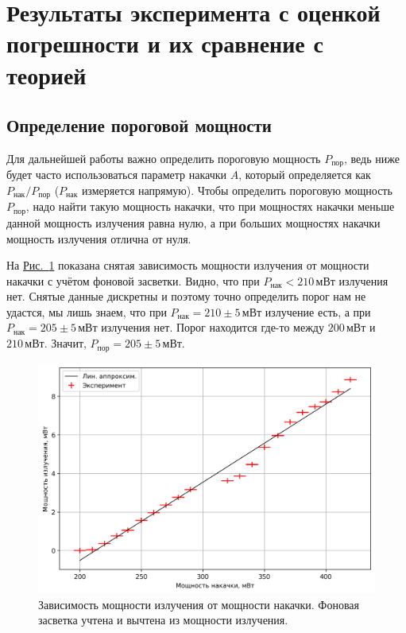 \documentclass[12pt]{article}
\newcommand*{\figref}[2][]{\hyperref[#2]{Рис.~\ref*{#2}#1}}
\begin{document}
	\section{Результаты эксперимента с оценкой погрешности и их сравнение с теорией}

	\subsection{Определение пороговой мощности}

	Для дальнейшей работы важно определить пороговую мощность $P_\text{пор}$, ведь ниже будет часто использоваться параметр накачки $A$, который определяется как $P_\text{нак} / P_\text{пор}$ ($P_\text{нак}$ измеряется напрямую). Чтобы определить пороговую мощность $P_\text{пор}$, надо найти такую мощность накачки, что при мощностях накачки меньше данной мощность излучения равна нулю, а при больших мощностях накачки мощность излучения отлична от нуля.

	На \figref{fig:p_iz_vs_p_nak} показана снятая зависимость мощности излучения от мощности накачки с учётом фоновой засветки. Видно, что при $P_\text{нак}<210\,\text{мВт}$ излучения нет. Снятые данные дискретны и поэтому точно определить порог нам не удастся, мы лишь знаем, что при $P_\text{нак}=210\pm5\,\text{мВт}$ излучение есть, а при $P_\text{нак}=205\pm5\,\text{мВт}$ излучения нет. Порог находится где-то между $200\,\text{мВт}$ и $210\,\text{мВт}$. Значит, $P_\text{пор} = 205\pm5\,\text{мВт}.$

	\begin{figure}[tb]
		\centering
		\includegraphics[width=\textwidth]{../figures/p_iz_vs_p_nak.png}
		\caption{Зависимость мощности излучения от мощности накачки. Фоновая засветка учтена и вычтена из мощности излучения.}
		\label{fig:p_iz_vs_p_nak}
	\end{figure}
\end{document}
